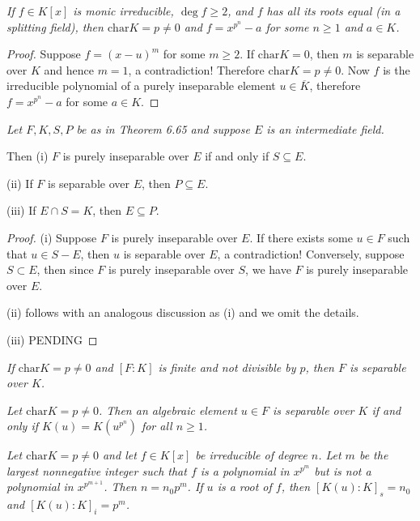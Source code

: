 \begin{problem}\em
If $f\in K[x]$ is monic irreducible, $\deg{f}\geq 2$, and $f$ has all its roots equal (in a splitting field), then $\mathrm{char}K=p\neq 0$ and $f=x^{p^n}-a$ for some $n\geq 1$ and $a\in K$.
\end{problem}
\begin{proof}
Suppose $f=(x-u)^m$ for some $m\ge 2$. If $\mathrm{char}K=0$, then $m$ is separable over $K$ and hence $m=1$, a contradiction! Therefore $\mathrm{char}K=p\ne 0$. Now $f$ is the irreducible polynomial of a purely inseparable element $u\in\overline{K}$, therefore $f=x^{p^n}-a$ for some $a\in K$.
\end{proof}
\begin{problem}\em
Let $F, K, S, P$ be as in Theorem 6.65 and suppose $E$ is an intermediate field.\par
Then
(i) $F$ is purely inseparable over $E$ if and only if $S\subseteq E$.\par
(ii) If $F$ is separable over $E$, then $P\subseteq E$.\par
(iii) If $E\cap S=K$, then $E\subseteq P$.
\end{problem}
\begin{proof}
(i) Suppose $F$ is purely inseparable over $E$. If there exists some $u\in F$ such that $u\in S-E$, then $u$ is separable over $E$, a contradiction! Conversely, suppose $S\subset E$, then since $F$ is purely inseparable over $S$, we have $F$ is purely inseparable over $E$.\par
(ii) follows with an analogous discussion as (i) and we omit the details.\par
(iii) PENDING
\end{proof}
\begin{problem}\em
If $\mathrm{char}K=p\neq 0$ and $[F:K]$ is finite and not divisible by $p$, then $F$ is separable over $K$.
\end{problem}
\begin{problem}\em
Let $\mathrm{char}K=p\neq 0$. Then an algebraic element $u\in F$ is separable over $K$ if and only if $K(u)=K(u^{p^n})$ for all $n\geq 1$.
\end{problem}
\begin{problem}\em
Let $\mathrm{char}K=p\neq 0$ and let $f\in K[x]$ be irreducible of degree $n$.
Let $m$ be the largest nonnegative integer such that $f$ is a polynomial in $x^{p^m}$ but is not a polynomial in $x^{p^{m+1}}$. Then $n=n_0 p^m$. If $u$ is a root of $f$, then $[K(u):K]_s=n_0$ and $[K(u):K]_i=p^m$.
\end{problem}
